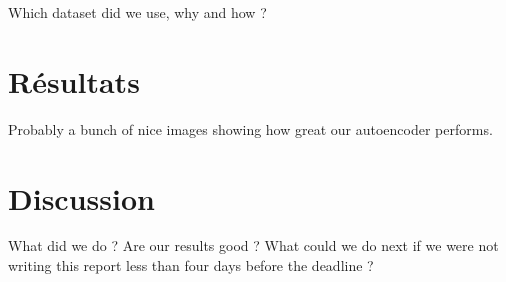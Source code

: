 \documentclass[10pt,twocolumn,letterpaper]{article}
\begin{document}
Which dataset did we use, why and how ?

\section{Résultats}

Probably a bunch of nice images showing how great our autoencoder performs.

\section{Discussion} %

What did we do ? Are our results good ? What could we do next if we were not writing this report less than four days before the deadline ?

{\small


}
\end{document}
